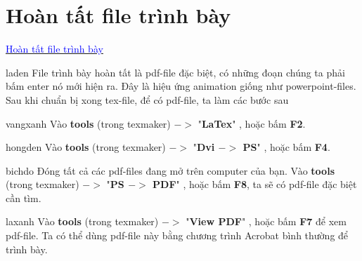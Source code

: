\documentclass{beamer}
\numberwithin{equation}{section}
\newcommand{\duong}[1]{\textcolor{blue}{#1}}
\begin{document}
\section{Hoàn tất file trình bày}
\begin{frame}
\underline{ \duong{\Large Hoàn tất file trình bày}} %

\medskip

\begin{beamercolorbox}[sep=.1em,wd=4.5in]{laden}
File trình bày hoàn tất là pdf-file đặc biệt, có những đoạn chúng ta phải bấm enter nó mới hiện ra. Đây là hiệu ứng animation giống như powerpoint-files. Sau khi chuẩn bị xong tex-file, để có pdf-file, ta làm các bước sau	\end{beamercolorbox}

\medskip
\begin{beamercolorbox}[sep=.1em,wd=4.5in]{vangxanh}
Vào {\bf tools} (trong texmaker) $->$  "{\bf LaTex}" , hoặc bấm {\bf F2}.
\end{beamercolorbox}
\medskip
\begin{beamercolorbox}[sep=.1em,wd=4.5in]{hongden}
Vào {\bf tools} (trong texmaker) $->$ "{\bf Dvi $->$ PS}" , hoặc bấm {\bf F4}.
\end{beamercolorbox} 
 \medskip
\begin{beamercolorbox}[sep=.1em,wd=4.5in]{bichdo} 
 Đóng tất cả các pdf-files đang mở trên computer của bạn. Vào {\bf tools} (trong texmaker) $->$ "{\bf PS $->$ PDF}" , hoặc bấm {\bf F8}, ta sẽ có pdf-file đặc biệt cần tìm.\end{beamercolorbox}

  \medskip
 \begin{beamercolorbox}[sep=.1em,wd=4.5in]{laxanh} 
  Vào {\bf tools} (trong texmaker) $->$  "{\bf View PDF}" , hoặc bấm {\bf F7} để xem pdf-file. Ta có thể dùng  pdf-file này bằng chương trình Acrobat bình thường để trình bày.\end{beamercolorbox}
  \end{frame}
\end{document}
